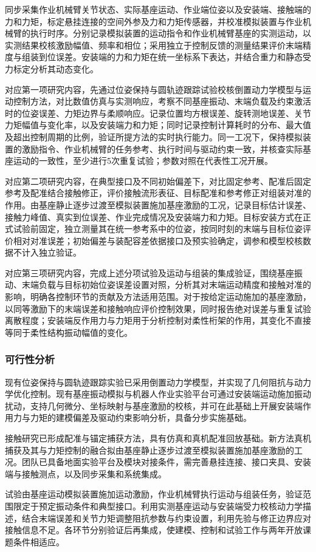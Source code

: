 同步采集作业机械臂关节状态、实际基座运动、作业端位姿以及安装端、接触端的力和力矩，标定悬挂连接的空间外参及力和力矩传感器，并校准模拟装置与作业机械臂的执行时序。分别记录模拟装置的运动指令和作业机械臂基座的实测运动，以实测结果校核激励幅值、频率和相位；采用独立于控制反馈的测量结果评价末端精度与组装到位误差。安装端的力和力矩在统一坐标系下表达，并结合重力和静态受力标定分析其动态变化。

对应第一项研究内容，先通过位姿保持与圆轨迹跟踪试验校核倒置动力学模型与运动控制方法，对比数值仿真与实测响应，考察不同基座振动、末端负载及约束激活时的位姿误差、力矩边界与柔顺响应。记录位置均方根误差、旋转测地误差、关节力矩幅值与变化率，以及安装端力和力矩；同时记录控制计算耗时的分布、最大值及超出控制周期的比例，验证所提方法的实时执行能力。同一工况下，保持模拟装置的激励指令、作业机械臂的任务参考、执行时间与驱动约束一致，并核查实际基座运动的一致性，至少进行5次重复试验；参数对照在代表性工况开展。

对应第二项研究内容，在典型接口及不同初始偏差下，对比固定参考、配准后固定参考及配准结合接触修正，评价接触流形表征、目标配准和参考修正对组装对准的作用。由基座静止逐步过渡至模拟装置施加基座激励的工况，记录目标估计误差、接触力峰值、真实到位误差、作业完成情况及安装端力和力矩。目标安装方式在正式试验前固定，独立测量其在统一参考系中的位姿，按同时刻的末端与目标位姿评价相对对准误差；初始偏差与装配容差依据接口及预实验确定，调参和模型校核数据不计入独立验证。

对应第三项研究内容，完成上述分项试验及运动与组装的集成验证，围绕基座振动、末端负载与目标初始位姿误差设置对照，分析其对末端运动精度和接触对准的影响，明确各控制环节的贡献及方法适用范围。对于按给定运动施加的基座激励，以同等激励下的末端误差和接触响应评价控制效果，同时报告绝对误差与重复试验离散程度；安装端反作用力与力矩用于分析控制对柔性桁架的作用，其变化不直接等同于柔性结构振动幅值的变化。

\subsubsection{可行性分析}


现有位姿保持与圆轨迹跟踪实验已采用倒置动力学模型，并实现了几何阻抗与动力学优化控制。现有基座振动模拟与机器人作业实验平台可通过安装端运动施加振动扰动，支持几何微分、坐标映射与基座激励的校核，并可在此基础上开展安装端作用力与力矩的建模偏差及驱动约束影响分析，具备分步实施基础。


接触研究已形成配准与锚定捕获方法，具有仿真和真机配准回放基础。新方法真机捕获及其与力矩控制的融合拟由基座静止逐步过渡至模拟装置施加基座激励的工况。团队已具备地面实验平台及模块对接条件，需完善悬挂连接、接口夹具、安装端与接触测点，以及同步采集和系统集成。


试验由基座运动模拟装置施加运动激励，作业机械臂执行运动与组装任务，验证范围限定于预定振动条件和典型接口。利用实测基座运动与安装端受力校核动力学描述，结合末端误差和关节力矩调整阻抗参数与约束设置，利用先验与修正边界应对接触信息不足。各环节分别验证后再集成，使建模、控制和试验工作与两年开放课题条件相适应。

